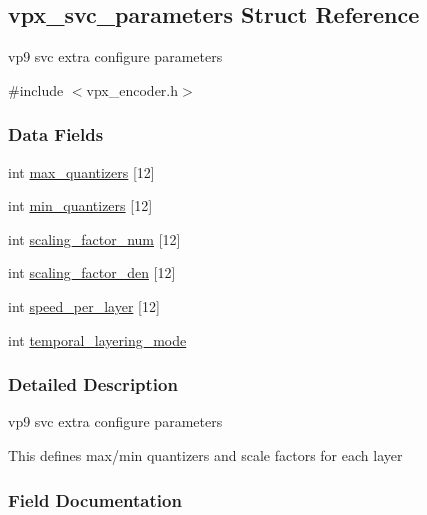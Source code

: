\hypertarget{structvpx__svc__parameters}{}\subsection{vpx\+\_\+svc\+\_\+parameters Struct Reference}
\label{structvpx__svc__parameters}


vp9 svc extra configure parameters  




{\ttfamily \#include $<$vpx\+\_\+encoder.\+h$>$}

\subsubsection*{Data Fields}
\begin{DoxyCompactItemize}
\item 
int \hyperlink{structvpx__svc__parameters_aae494f231727fd9f5feb47b465452509}{max\+\_\+quantizers} \mbox{[}12\mbox{]}
\item 
int \hyperlink{structvpx__svc__parameters_a4b32be6e2e6f0c808c4ed3044f3c7ddf}{min\+\_\+quantizers} \mbox{[}12\mbox{]}
\item 
int \hyperlink{structvpx__svc__parameters_a79544d65e1b3bb0b71f85b3f2b7167bf}{scaling\+\_\+factor\+\_\+num} \mbox{[}12\mbox{]}
\item 
int \hyperlink{structvpx__svc__parameters_aaf33b6a09e97e04763b6d10de3899ee4}{scaling\+\_\+factor\+\_\+den} \mbox{[}12\mbox{]}
\item 
int \hyperlink{structvpx__svc__parameters_a964f63808fb21ead3773d01184ee010c}{speed\+\_\+per\+\_\+layer} \mbox{[}12\mbox{]}
\item 
int \hyperlink{structvpx__svc__parameters_adf8ca5b4011bf6c0d6248bafc4177190}{temporal\+\_\+layering\+\_\+mode}
\end{DoxyCompactItemize}


\subsubsection{Detailed Description}
vp9 svc extra configure parameters 

This defines max/min quantizers and scale factors for each layer 

\subsubsection{Field Documentation}
